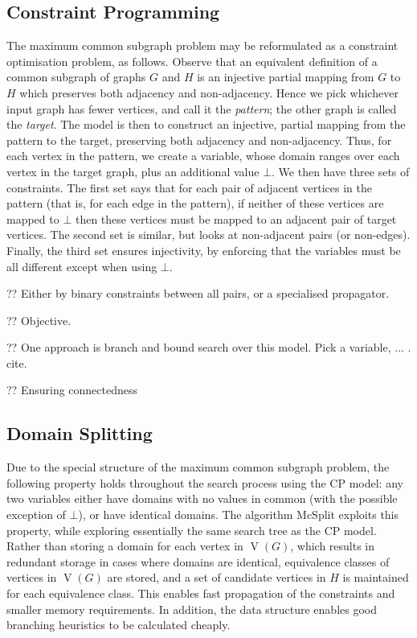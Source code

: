 \documentclass[sigconf]{acmart}
\begin{document}
\subsection{Constraint Programming}

The maximum common subgraph problem may be reformulated as a constraint optimisation problem, as
follows.  Observe that an equivalent definition of a common subgraph of graphs $G$ and $H$ is an
injective partial mapping from $G$ to $H$ which preserves both adjacency and non-adjacency. Hence we
pick whichever input graph has fewer vertices, and call it the \emph{pattern}; the other graph is
called the \emph{target}. The model is then to construct an injective, partial mapping from the
pattern to the target, preserving both adjacency and non-adjacency. Thus, for each vertex in the
pattern, we create a variable, whose domain ranges over each vertex in the target graph, plus an
additional value $\bot$. We then have three sets of constraints. The first set says that for each
pair of adjacent vertices in the pattern (that is, for each edge in the pattern), if neither of
these vertices are mapped to $\bot$ then these vertices must be mapped to an adjacent pair of target
vertices. The second set is similar, but looks at non-adjacent pairs (or non-edges).  Finally, the
third set ensures injectivity, by enforcing that the variables must be all different except when
using $\bot$.

?? Either by binary constraints between all pairs, or a specialised propagator.

?? Objective.

?? One approach is branch and bound search over this model. Pick a variable, ... . cite.

?? Ensuring connectedness

\subsection{Domain Splitting}

Due to the special structure of the maximum common subgraph problem, the following property holds
throughout the search process using the CP model: any two variables either have domains with no
values in common (with the possible exception of $\bot$), or have identical domains. The algorithm
McSplit exploits this property, while exploring essentially the same search tree as the CP model.
Rather than storing a domain for each vertex in $\operatorname{V}(G)$, which results in redundant
storage in cases where domains are identical, equivalence classes of vertices in
$\operatorname{V}(G)$ are stored, and a set of candidate vertices in $H$ is maintained for each
equivalence class. This enables fast propagation of the constraints and smaller memory requirements.
In addition, the data structure enables good branching heuristics to be calculated cheaply.
\end{document}
